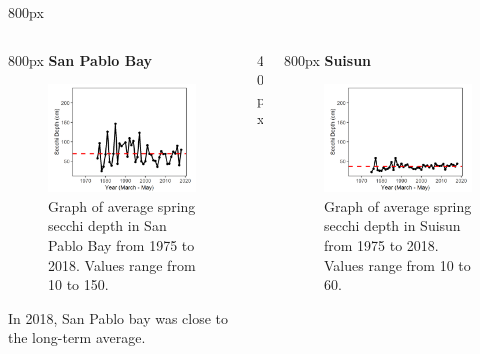 \documentclass[
]{book}
\begin{document}
\begin{column}{800px\textwidth}
\end{column}

\begin{columns}[T]
\begin{column}{800px\textwidth}
\textbf{San Pablo Bay}

\begin{figure}
\includegraphics[width=15.25in]{figures/secchi_splspring} \caption{Graph of average spring secchi depth in San Pablo Bay from 1975 to 2018. Values range from 10 to 150.}\label{fig:unnamed-chunk-8}
\end{figure}

In 2018, San Pablo bay was close to the long-term average.
\end{column}

\begin{column}{40px\textwidth}
~
\end{column}

\begin{column}{800px\textwidth}
\textbf{Suisun}

\begin{figure}
\includegraphics[width=15.25in]{figures/secchi_ssspring} \caption{Graph of average spring secchi depth in Suisun from 1975 to 2018. Values range from 10 to 60.}\label{fig:unnamed-chunk-9}
\end{figure}


\end{column}
\end{columns}
\end{document}
